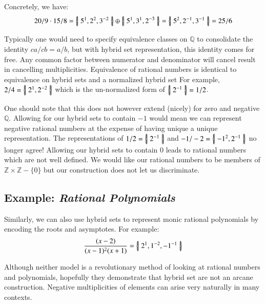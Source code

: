 \begin{example}
	Concretely, we have:
	\begin{equation*}
		20/9 \cdot 15/8 
			= \left\{ \! \left| \; 5^1, 2^2, 3^{-2} \; \right| \! \right\} \oplus \left\{ \! \left| \; 5^1, 3^1, 2^{-3} \; \right| \! \right\} 
			= \left\{ \! \left| \; 5^2, 2^{-1}, 3^{-1} \; \right| \! \right\} 
			= 25/6
	\end{equation*}
\end{example}


Typically one would need to specify equivalence classes on $\mathbb{Q}$ to consolidate the identity $ca/cb = a/b$,
but with hybrid set representation, this identity comes for free.
Any common factor between numerator and denominator will cancel result in cancelling multiplicities. 
Equivalence of rational numbers is identical to equivalence on hybrid sets and a normalized hybrid set
For example, $2/4 = \left\{ \! \left| \; 2^1, 2^{-2} \; \right| \! \right\}$ which is the un-normalized form of $\left\{ \! \left| \; 2^{-1} \; \right| \! \right\} = 1/2$.


One should note that this does not however extend (nicely) for zero and negative $\mathbb{Q}$.
Allowing for our hybrid sets to contain $-1$ would mean we can represent negative rational numbers at the expense of having unique a unique representation. 
The representations of $1/2 = \left\{ \! \left| \;  2^{-1} \; \right| \! \right\}$ and $-1/-2 = \left\{ \! \left| \; -1^2, 2^{-1} \; \right| \! \right\}$ no longer agree!
Allowing our hybrid sets to contain $0$ leads to rational numbers which are not well defined.
We would like our rational numbers to be members of $\mathbb{Z} \times \mathbb{Z} - \{ 0 \}$ but our construction does not let us discriminate.



\subsection{Example: \emph{Rational Polynomials}}

Similarly, we can also use hybrid sets to represent monic rational polynomials by encoding the roots and asymptotes.
For example:
\begin{equation}
	\frac{(x-2)}{(x-1)^2(x+1)} = \left\{ \! \left| \;  2^1, 1^{-2}, -1^{-1}  \; \right| \! \right\}
\end{equation}

Although neither model is a revolutionary method of looking at rational numbers and polynomials,
hopefully they demonstrate that hybrid set are not an arcane construction. 
Negative multiplicities of elements can arise very naturally in many contexts.



